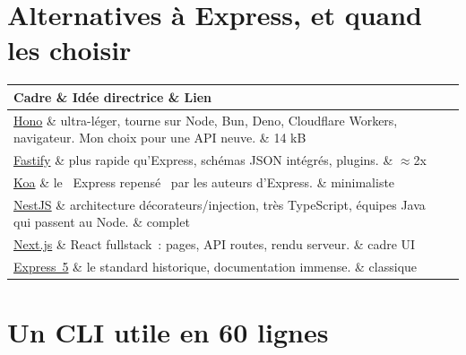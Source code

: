 \documentclass[12pt,a4paper,twoside,openright]{book}
\makeatletter
\newcommand{\link}[2]{\href{#2}{#1}}
\newenvironment{tabz}[1]{\rowcolors{2}{white}{tralight}%
  \small\setlength{\tabcolsep}{5pt}\setlength{\LTpre}{3pt}\setlength{\LTpost}{3pt}%
  \begin{longtable}{@{}#1@{}}\toprule}
  {\bottomrule\end{longtable}\normalfont\setlength{\tabcolsep}{6pt}}
\newcommand{\thd}[1]{\textbf{\color{white}#1}}
\newcommand{\headrow}{\rowcolor{theadbg}}
\makeatother
\begin{document}
\section{Alternatives \`a Express, et quand les choisir}

\begin{tabz}{lXl}
  \headrow \thd{Cadre} \& \thd{Id\'ee directrice} \& \thd{Lien} \\
  \midrule
  \link{Hono}{https://hono.dev/} \& ultra-l\'eger, tourne sur Node, Bun, Deno, Cloudflare Workers, navigateur. Mon choix pour une API neuve. \& 14 kB \\
  \link{Fastify}{https://fastify.dev/} \& plus rapide qu'Express, sch\'emas JSON int\'egr\'es, plugins. \& $\approx$2x \\
  \link{Koa}{https://koajs.com/} \& le \og ~Express repens\'e~ \fg{} par les auteurs d'Express. \& minimaliste \\
  \link{NestJS}{https://nestjs.com/} \& architecture d\'ecorateurs/injection, tr\`es TypeScript, \'equipes Java qui passent au Node. \& complet \\
  \link{Next.js}{https://nextjs.org/} \& React fullstack~: pages, API routes, rendu serveur. \& cadre UI \\
  \link{Express~5}{https://expressjs.com/fr/} \& le standard historique, documentation immense. \& classique \\
\end{tabz}

\section{Un CLI utile en 60 lignes}
\end{document}

